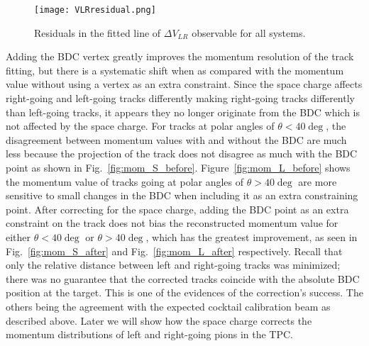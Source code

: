 \begin{figure}[!htb]
\texttt{[image: VLRresidual.png]}
\caption{Residuals in the fitted line of $\Delta V_{LR}$ observable for all systems.}
\label{fig:vlrResidual}
\end{figure}

Adding the BDC vertex greatly improves the momentum resolution of the track fitting, but there is a systematic shift when as compared with the momentum value without using a vertex as an extra constraint. Since the space charge affects right-going and left-going tracks differently making right-going tracks differently than left-going tracks, it appears they no longer originate from the BDC which is not affected by the space charge. For tracks at polar angles of $\theta < 40 \deg$, the disagreement between momentum values with and without the BDC are much less because the projection of the track does not disagree as much with the BDC point as shown in Fig.~\ref{fig:mom_S_before}. Figure~\ref{fig:mom_L_before} shows the momentum value of tracks going at polar angles of $\theta > 40 \deg$ are more sensitive to small changes in the BDC when including it as an extra constraining point. After correcting for the space charge, adding the BDC point as an extra constraint on the track does not bias the reconstructed momentum value for either $\theta < 40 \deg$ or $\theta > 40 \deg$, which has the greatest improvement, as seen in Fig.~\ref{fig:mom_S_after} and Fig.~\ref{fig:mom_L_after} respectively. Recall that only the relative distance between left and right-going tracks was minimized; there was no guarantee that the corrected tracks coincide with the absolute BDC position at the target. This is one of the evidences of the correction's success. The others being the agreement with the expected cocktail calibration beam as described above. Later we will show how the space charge corrects the momentum distributions of left and right-going pions in the TPC. 


